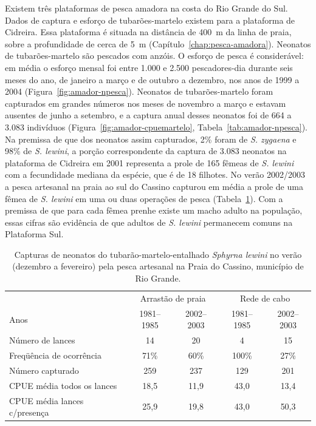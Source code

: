 \documentclass[a4paper,11pt,twoside,showtrims,onecolumn,openright,final]{memoir}
\begin{document}
Existem três plataformas de pesca amadora na costa do Rio Grande do Sul.
Dados de captura e esforço de tubarões-martelo existem para a plataforma de Cidreira. 
Essa plataforma é situada na distância de 400~m da linha de praia, sobre a profundidade 
de cerca de 5~m (Capítulo~\ref{chap:pesca-amadora}). Neonatos de tubarões-martelo são pescados com anzóis. 
O esforço de pesca é considerável: em média o esforço mensal foi entre 1.000 e 2.500 pescadores-dia 
durante seis meses do ano, de janeiro a março e de outubro a dezembro, nos anos de 1999 a 2004 (Figura~\ref{fig:amador-npesca}).  %
Neonatos de tubarões-martelo foram capturados em grandes números nos meses de novembro a março 
e estavam ausentes de junho a setembro, e a captura anual desses neonatos 
foi de 664 a 3.083 indivíduos (Figura~\ref{fig:amador-cpuemartelo}, Tabela~\ref{tab:amador-npesca}). %
Na premissa de que dos neonatos assim capturados, 2\% foram de \emph{S. zygaena} 
e 98\% de \emph{S. lewini}, a porção correspondente da captura de 3.083 neonatos na plataforma 
de Cidreira em 2001 representa a prole de 165 fêmeas de \emph{S. lewini} com a fecundidade mediana 
da espécie, que é de 18 filhotes. No verão 2002/2003 a pesca artesanal na praia ao sul do Cassino 
capturou em média a prole de uma fêmea de \emph{S. lewini} em uma ou duas operações de pesca (Tabela~\ref{tab:lewini-capturas-neonatos}). 
Com a premissa de que para cada fêmea prenhe existe um macho adulto na população, essas 
cifras são evidência de que adultos de \emph{S. lewini}  permanecem comuns na Plataforma Sul.

%
%

\begin{table}
\caption[Capturas de neonatos do tubarão-martelo-entalhado \emph{Sphyrna lewini} pela pesca artesanal no verão]
	{Capturas de neonatos do tubarão-martelo-entalhado \emph{Sphyrna lewini} no verão (dezembro a fevereiro) 
         pela pesca artesanal na Praia do Cassino, município de Rio Grande.}
\label{tab:lewini-capturas-neonatos}
\begin{small}
\begin{tabular*}{\textwidth}{l@{\extracolsep{\fill}}cccc}
\toprule
				& \multicolumn{2}{c}{Arrastão de praia}	& \multicolumn{2}{c}{Rede de cabo}	\\
\cmidrule(r){2-3} \cmidrule(l){4-5}
Anos 				& 1981--1985	& 2002--2003		& 1981--1985	& 2002--2003		\\
\midrule
Número de lances		& 14		& 20			& 4		& 15			\\
Freqüência de ocorrência	& 71\%		& 60\%			& 100\%		& 27\%			\\
Número capturado		& 259		& 237			& 129		& 201			\\
CPUE média todos os lances	& 18,5		& 11,9			& 43,0		& 13,4			\\
CPUE média lances c/presença	& 25,9		& 19,8			& 43,0		& 50,3			\\
\bottomrule
\end{tabular*}
\end{small}
\end{table}
\end{document}
